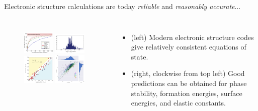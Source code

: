 \documentclass[aspectratio=169]{beamer}
\begin{document}
\begin{frame}{Electronic structure calculations are today \textit{reliable} and \textit{reasonably accurate}...}
\begin{columns}
\begin{figure}
        \centering
        \includegraphics[width=0.45\textwidth]{lectures/slides_tex/icsd_e_hull.png}
        \includegraphics[width=0.45\textwidth]{lectures/slides_tex/formation_energies.png}\\
        \includegraphics[width=0.45\textwidth]{lectures/slides_tex/surface_energies.png}
        \includegraphics[width=0.45\textwidth]{lectures/slides_tex/elastic_constants.png}
\end{figure}
\begin{itemize}
    \tiny
    \item (left) Modern electronic structure codes give relatively consistent equations of state.
    \item (right, clockwise from top left) Good predictions can be obtained for phase stability,\cite{sunThermodynamicScaleInorganic2016} formation energies, surface energies,\cite{tranSurfaceEnergiesElemental2016} and elastic constants\cite{dejongChartingCompleteElastic2015}.
\end{itemize}
\end{columns}
\end{frame}
\end{document}
